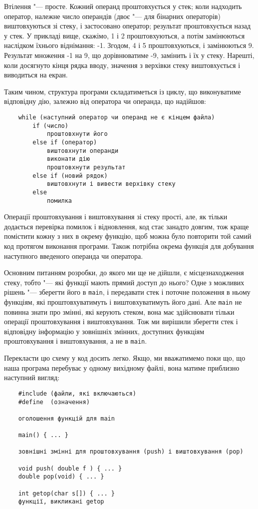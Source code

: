 \documentclass[a4paper,12pt]{book}
\begin{document}
  Втілення "--- просте. Кожний операнд проштовхується у стек; коли надходить оператор,
  належне число операндів (двоє "--- для бінарних операторів) виштовхуються зі стеку, і
  застосовано оператор; результат проштовхується назад у стек. У прикладі вище, скажімо,
  1 і 2 проштовхуються, а потім замінюються наслідком їхнього віднімання: -1. Згодом, 4 і
  5 проштовхуються, і замінюються 9. Результат множення -1 на 9, що дорівнюватиме -9,
  замінить і їх у стеку. Нарешті, коли досягнуто кінця рядка вводу, значення з верхівки
  стеку виштовхується і виводиться на екран.

  Таким чином, структура програми складатиметься із циклу, що виконуватиме відповідну
  дію, залежно від оператора чи операнда, що надійшов:
  \begin{verbatim}
    while (наступний оператор чи операнд не є кінцем файла)
        if (число)
            проштовхнути його
        else if (оператор)
            виштовхнути операнди
            виконати дію
            проштовхнути результат
        else if (новий рядок)
            виштовхнути і вивести верхівку стеку
        else
            помилка
  \end{verbatim}

  Операції проштовхування і виштовхування зі стеку прості, але, як тільки додається
  перевірка помилок і відновлення, код стає занадто довгим, тож краще помістити кожну з
  них в окрему функцію, щоб можна було повторити той самий код протягом виконання
  програми. Також потрібна окрема функція для добування наступного введеного операнда чи
  оператора.

  Основним питанням розробки, до якого ми ще не дійшли, є місцезнаходження стеку, тобто
  "--- які функції мають прямий доступ до нього? Одне з можливих рішень "---
  зберегти його в \texttt{main}, і передавати стек і поточне положення в ньому функціям,
  які проштовхуватимуть і виштовхуватимуть його дані. Але \texttt{main} не повинна знати
  про змінні, які керують стеком, вона має здійснювати тільки операції проштовхування і
  виштовхування. Тож ми вирішили зберегти стек і відповідну інформацію у зовнішніх
  змінних, доступних функціям проштовхування і виштовхування, а не в \texttt{main}.

  Перекласти цю схему у код досить легко. Якщо, ми вважатимемо поки що, що наша
  програма перебуває у одному вихідному файлі, вона матиме приблизно наступний
  вигляд:
  \begin{verbatim}
    #include (файли, які включаються)
    #define  (означення)

    оголошення функцій для main

    main() { ... }

    зовнішні змінні для проштовхування (push) і виштовхування (pop)

    void push( double f ) { ... }
    double pop(void) { ... }

    int getop(char s[]) { ... }
    функції, викликані getop
  \end{verbatim}
\end{document}
